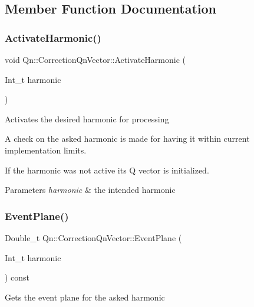 \subsection{Member Function Documentation}
\mbox{\label{classQn_1_1CorrectionQnVector_a6fcf855ca57bab1752ebb8098aa8da8d}} 
\subsubsection{\texorpdfstring{Activate\+Harmonic()}{ActivateHarmonic()}}
{\footnotesize\ttfamily void Qn\+::\+Correction\+Qn\+Vector\+::\+Activate\+Harmonic (\begin{DoxyParamCaption}\item[{Int\+\_\+t}]{harmonic }\end{DoxyParamCaption})}

Activates the desired harmonic for processing

A check on the asked harmonic is made for having it within current implementation limits.

If the harmonic was not active its Q vector is initialized.


\begin{DoxyParams}{Parameters}
{\em harmonic} & the intended harmonic \\
\hline
\end{DoxyParams}
\mbox{\label{classQn_1_1CorrectionQnVector_afa869b89c2b19a6f473572e45e6c33ec}} 
\subsubsection{\texorpdfstring{Event\+Plane()}{EventPlane()}}
{\footnotesize\ttfamily Double\+\_\+t Qn\+::\+Correction\+Qn\+Vector\+::\+Event\+Plane (\begin{DoxyParamCaption}\item[{Int\+\_\+t}]{harmonic }\end{DoxyParamCaption}) const}

Gets the event plane for the asked harmonic

